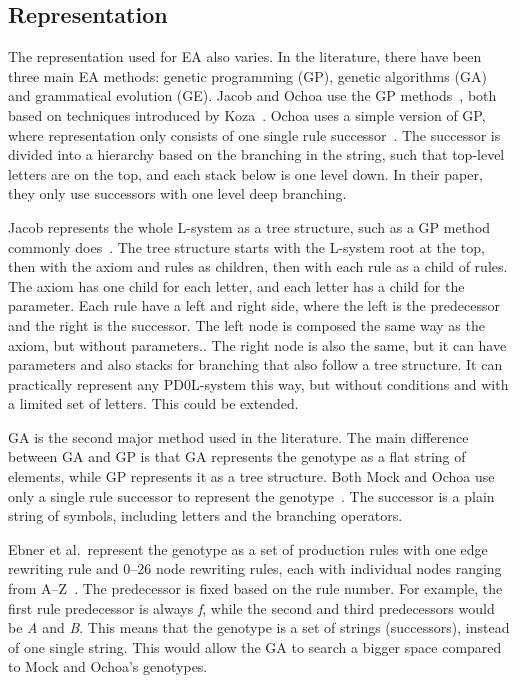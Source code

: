 \subsection{Representation}
The representation used for EA also varies.
In the literature, there have been three main EA methods: genetic programming (GP), genetic algorithms (GA) and grammatical evolution (GE).
Jacob and Ochoa use the GP methods~\cite{1994Jacob,1995Jacob,1998Ochoa}, both based on techniques introduced by Koza~\cite{1992Koza}.
Ochoa uses a simple version of GP, where representation only consists of one single rule successor~\cite{1998Ochoa}.
The successor is divided into a hierarchy based on the branching in the string, such that top-level letters are on the top, and each stack below is one level down.
In their paper, they only use successors with one level deep branching.

Jacob represents the whole L-system as a tree structure, such as a GP method commonly does~\cite{1994Jacob}.
The tree structure starts with the L-system root at the top, then with the axiom and rules as children, then with each rule as a child of rules.
The axiom has one child for each letter, and each letter has a child for the parameter.
Each rule have a left and right side, where the left is the predecessor and the right is the successor.
The left node is composed the same way as the axiom, but without parameters..
The right node is also the same, but it can have parameters and also stacks for branching that also follow a tree structure.
It can practically represent any PD0L-system this way, but without conditions and with a limited set of letters.
This could be extended.

GA is the second major method used in the literature.
The main difference between GA and GP is that GA represents the genotype as a flat string of elements, while GP represents it as a tree structure.
Both Mock and Ochoa use only a single rule successor to represent the genotype~\cite{1998Mock,1998Ochoa}.
The successor is a plain string of symbols, including letters and the branching operators.

Ebner et al.\ represent the genotype as a set of production rules with one edge rewriting rule and 0--26 node rewriting rules, each with individual nodes ranging from A--Z~\cite{2002Ebner,2003Ebner}.
The predecessor is fixed based on the rule number.
For example, the first rule predecessor is always \textit{f}, while the second and third predecessors would be \textit{A} and \textit{B}.
This means that the genotype is a set of strings (successors), instead of one single string.
This would allow the GA to search a bigger space compared to Mock and Ochoa's genotypes.


